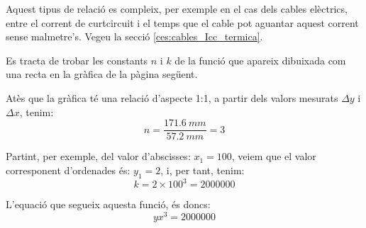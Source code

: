 Aquest tipus de relació es compleix, per exemple en el cas dels cables elèctrics, entre el corrent de curtcircuit i el temps que el cable pot aguantar aquest corrent sense malmetre's. Vegeu la secció \vref{ces:cables_Icc_termica}.

	
\begin{exemple}[\ConstantsEscalaLogLog{}]
	\addcontentsxms{\ConstantsEscalaLogLog}
    Es tracta de trobar les constants $n$ i $k$ de la funció que apareix dibuixada com una recta en la gràfica de la pàgina següent.

     Atès que la gràfica té una relació d'aspecte 1:1, a partir dels valors mesurats $\Delta{}y$ i $\Delta{}x$, tenim:
    \[
        n = \frac{\qty{171,6}{mm}}{\qty{57,2}{mm}} = 3
    \]

    Partint, per exemple, del valor d'abscisses: $x_1=100$, veiem que el valor corresponent d'ordenades és: $y_1=2$, i, per tant, tenim:
    \[
        k = 2 \times 100^3  = \num{2000000}
    \]

    L'equació que segueix aquesta funció, és doncs:
    \[
        y x^3 = \num{2000000}
    \]

   \begin{center}
        
   \end{center}

\end{exemple}

